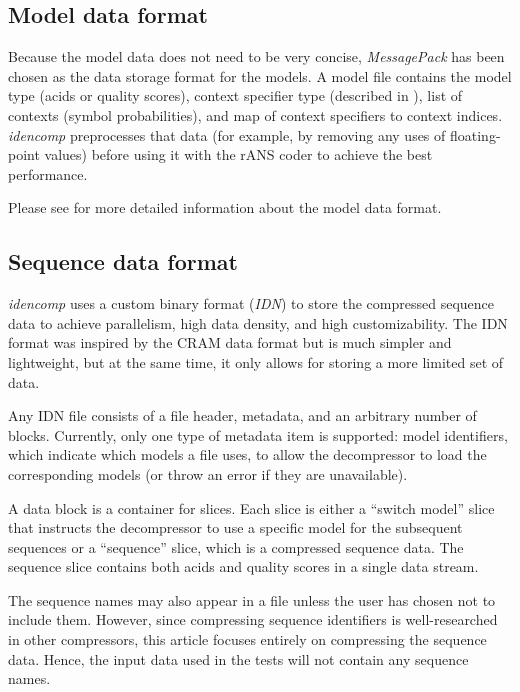 \subsection{Model data format}\label{subsec:model-data-format}

Because the model data does not need to be very concise, \emph{MessagePack}
has been
chosen as the data storage format for the models.
A model file contains the model type (acids or quality scores), context
specifier type (described in ), list of contexts
(symbol probabilities), and map of context specifiers to context indices.
\emph{idencomp} preprocesses that data (for example, by removing any uses of
floating-point values) before using it with the rANS coder to achieve the
best performance.

Please see  for more detailed information about the
model data format.

\subsection{Sequence data format}\label{subsec:sequence-data-format}

\emph{idencomp} uses a custom binary format (\emph{IDN}) to store the
compressed sequence
data to achieve parallelism, high data density, and high customizability.
The IDN format was inspired by the CRAM data format\cite{cram} but is much
simpler and
lightweight, but at the same time, it only allows for storing a more limited
set of data.

Any IDN file consists of a file header, metadata, and an arbitrary number of
blocks.
Currently, only one type of metadata item is supported: model identifiers,
which indicate which models a file uses, to allow the decompressor to load
the corresponding models (or throw an error if they are unavailable).

A data block is a container for slices.
Each slice is either a ``switch model'' slice that instructs the decompressor
to use a specific model for the subsequent sequences or a ``sequence'' slice,
which is a compressed sequence data.
The sequence slice contains both acids and quality scores in a single data
stream.

The sequence names may also appear in a file unless the user has chosen not
to include them.
However, since compressing sequence identifiers is well-researched in other
compressors, this article focuses entirely on compressing the sequence data.
Hence, the input data used in the tests will not contain any sequence names.

